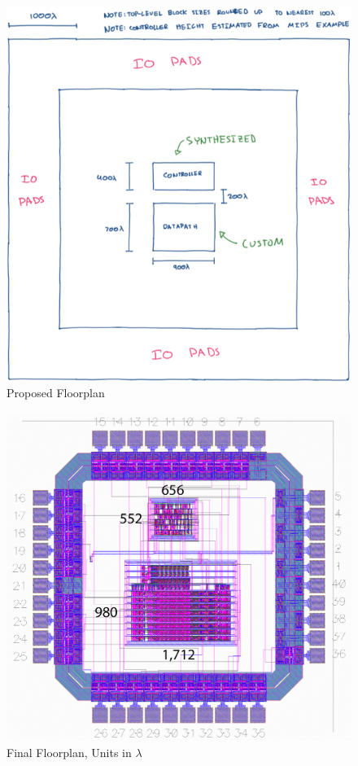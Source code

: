 \documentclass[12pt]{article}
\begin{document}
\begin{figure}[H]
    \begin{center}
    \includegraphics[width=12cm]{floorplan.png}
    \end{center}
    \caption{Proposed Floorplan}
    \label{fig:floorplan}
\end{figure}

\begin{figure}[H]
    \begin{center}
    \includegraphics[width=12cm]{HMMChipLabeled.png}
    \end{center}
    \caption{Final Floorplan, Units in $\lambda$}
    \label{fig:finalfloorplan}
\end{figure}
\end{document}
